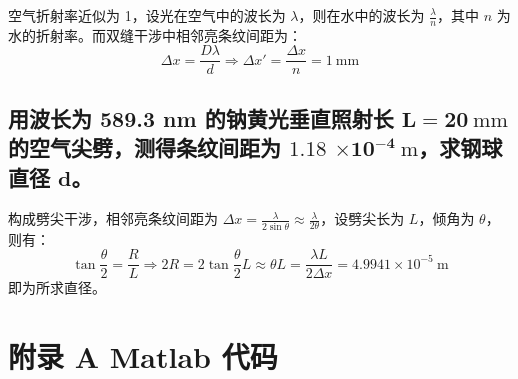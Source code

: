\documentclass[UTF8]{report}
\theoremstyle{MyLineTheoremStyle} %
\theoremstyle{MyBlockTheoremStyle} %
\theoremstyle{MySubsubsectionStyle} %
\begin{document}
空气折射率近似为 1，设光在空气中的波长为 $\lambda$，则在水中的波长为 $\frac{\lambda}{n}$，其中 $n$ 为水的折射率。而双缝干涉中相邻亮条纹间距为：
\begin{equation}
\Delta x = \frac{D \lambda}{d} \Longrightarrow \Delta x' = \frac{\Delta x}{n} = 1\ \mathrm{mm}
\end{equation}

\section{用波长为 589.3 nm 的钠黄光垂直照射长 $\boldsymbol{L = 20 \ \mathrm{mm}}$  的空气尖劈，测得条纹间距为 $\boldsymbol{1.18}$ $\boldsymbol{ \times 10^{-4}\ \mathrm{m}}$，求钢球直径 $\boldsymbol{d}$。}

构成劈尖干涉，相邻亮条纹间距为 $\Delta x = \frac{\lambda}{2 \sin \theta} \approx  \frac{\lambda}{2 \theta} $，设劈尖长为 $L$，倾角为 $\theta$，则有：
\begin{equation}
\tan \frac{\theta}{2} = \frac{R}{L} \Longrightarrow 2R = 2\tan \frac{\theta}{2} L  \approx \theta L  = \frac{\lambda L}{2 \Delta x} = 4.9941 \times 10^{-5}\ \mathrm{m}
\end{equation}
即为所求直径。












\newpage
\appendix
\titleformat{\chapter}[hang]{\normalfont\huge\bfseries\centering}{}{20pt}{}
\titlespacing*{\chapter}{0pt}{-25pt}{8pt} %
\titleformat{\section}[hang]{\normalfont\centering\Large\bfseries}{\thesection}{8pt}{}

\chapter*{附录 A\hspace*{20pt}  Matlab 代码}   
\thispagestyle{fancy} 
\setcounter{section}{0}   
\renewcommand\thesection{A.\arabic{section}}   
\renewcommand{\thefigure}{A.\arabic{figure}} 
\renewcommand{\thetable}{A.\arabic{table}}
\end{document}

